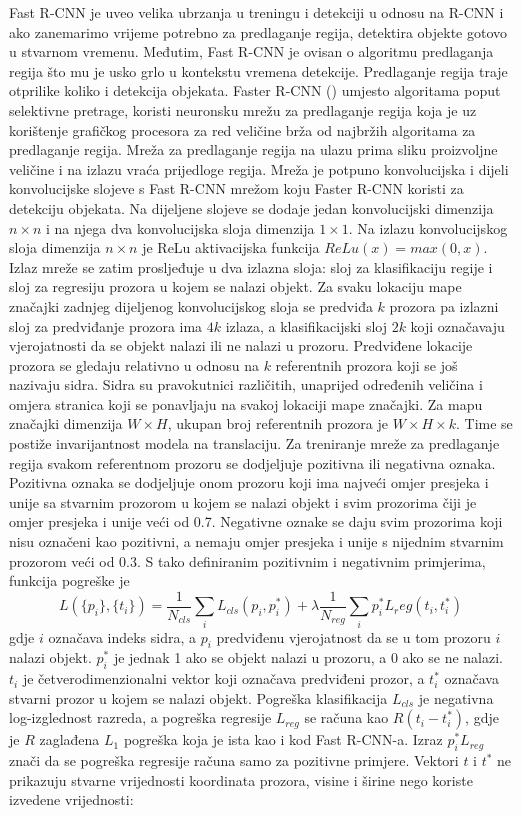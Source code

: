 Fast R-CNN je uveo velika ubrzanja u treningu i detekciji u odnosu na R-CNN i ako zanemarimo vrijeme potrebno za predlaganje regija, detektira objekte gotovo u stvarnom vremenu. Međutim, Fast R-CNN je ovisan o algoritmu predlaganja regija što mu je usko grlo u kontekstu vremena detekcije. Predlaganje regija traje otprilike koliko i detekcija objekata.
Faster R-CNN (\cite{NIPS2015_5638}) umjesto algoritama poput selektivne pretrage, koristi neuronsku mrežu za predlaganje regija koja je uz korištenje grafičkog procesora za red veličine brža od najbržih algoritama za predlaganje regija.
Mreža za predlaganje regija na ulazu prima sliku proizvoljne veličine i na izlazu vraća prijedloge regija. Mreža je potpuno konvolucijska i dijeli konvolucijske slojeve s Fast R-CNN mrežom koju Faster R-CNN koristi za detekciju objekata. Na dijeljene slojeve se dodaje jedan konvolucijski dimenzija $n \times n$ i na njega dva konvolucijska sloja dimenzija $1 \times 1$. Na izlazu konvolucijskog sloja dimenzija $n \times n$ je ReLu aktivacijska funkcija $ReLu(x) = max(0, x)$. Izlaz mreže se zatim prosljeđuje u dva izlazna sloja: sloj za klasifikaciju regije i sloj za regresiju prozora u kojem se nalazi objekt. 
Za svaku lokaciju mape značajki zadnjeg dijeljenog konvolucijskog sloja se predviđa $k$ prozora pa izlazni sloj za predviđanje prozora ima $4k$ izlaza, a klasifikacijski sloj $2k$ koji označavaju vjerojatnosti da se objekt nalazi ili ne nalazi u prozoru. Predviđene lokacije prozora se gledaju relativno u odnosu na $k$ referentnih prozora koji se još nazivaju sidra. Sidra su pravokutnici različitih, unaprijed određenih veličina i omjera stranica koji se ponavljaju na svakoj lokaciji mape značajki. Za mapu značajki dimenzija $W \times H$, ukupan broj referentnih prozora je $W \times H \times k$. Time se postiže invarijantnost modela na translaciju.
Za treniranje mreže za predlaganje regija svakom referentnom prozoru se dodjeljuje pozitivna ili negativna oznaka. Pozitivna oznaka se dodjeljuje onom prozoru koji ima najveći omjer presjeka i unije sa stvarnim prozorom u kojem se nalazi objekt i svim prozorima čiji je omjer presjeka i unije veći od 0.7. Negativne oznake se daju svim prozorima koji nisu označeni kao pozitivni, a nemaju omjer presjeka i unije s nijednim stvarnim prozorom veći od 0.3.
S tako definiranim pozitivnim i negativnim primjerima, funkcija pogreške je 
\[
	L(\{p_i\}, \{t_i\}) = \frac{1}{N_{cls}} \sum\limits_i L_{cls}(p_i, p_i^*) + \lambda \frac{1}{N_{reg}} \sum\limits_i p_i^* L_reg(t_i, t_i^*)
\]
gdje $i$ označava indeks sidra, a $p_i$ predviđenu vjerojatnost da se u tom prozoru $i$ nalazi objekt. $p_i^*$ je jednak 1 ako se objekt nalazi u prozoru, a 0 ako se ne nalazi. $t_i$ je četverodimenzionalni vektor koji označava predviđeni prozor, a $t_i^*$ označava stvarni prozor u kojem se nalazi objekt. Pogreška klasifikacija $L_{cls}$ je negativna log-izglednost razreda, a pogreška regresije $L_{reg}$ se računa kao $R(t_i - t_i^*)$, gdje je $R$ zaglađena $L_1$ pogreška koja je ista kao i kod Fast R-CNN-a. Izraz $p_i^*L_{reg}$ znači da se pogreška regresije računa samo za pozitivne primjere. Vektori $t$ i $t^*$ ne prikazuju stvarne vrijednosti koordinata prozora, visine i širine nego koriste izvedene vrijednosti:
